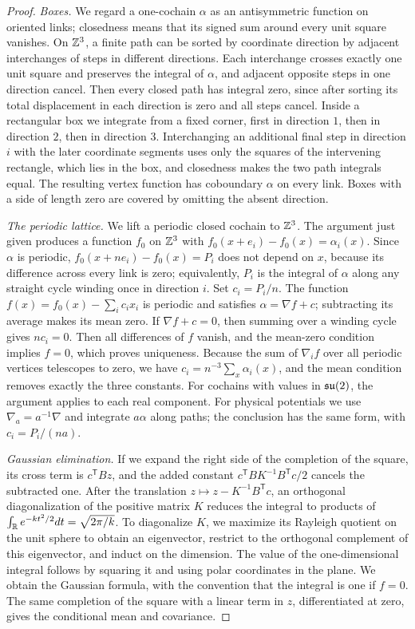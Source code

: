 \begin{proof}
\emph{Boxes.} We regard a one-cochain $\alpha$ as an antisymmetric function on oriented links; closedness means that its signed sum around every unit square vanishes. On $\mathbb Z^3$, a finite path can be sorted by coordinate direction by adjacent interchanges of steps in different directions. Each interchange crosses exactly one unit square and preserves the integral of $\alpha$, and adjacent opposite steps in one direction cancel. Then every closed path has integral zero, since after sorting its total displacement in each direction is zero and all steps cancel. Inside a rectangular box we integrate from a fixed corner, first in direction $1$, then in direction $2$, then in direction $3$. Interchanging an additional final step in direction $i$ with the later coordinate segments uses only the squares of the intervening rectangle, which lies in the box, and closedness makes the two path integrals equal. The resulting vertex function has coboundary $\alpha$ on every link. Boxes with a side of length zero are covered by omitting the absent direction.

\emph{The periodic lattice.} We lift a periodic closed cochain to $\mathbb Z^3$. The argument just given produces a function $f_0$ on $\mathbb Z^3$ with $f_0(x+e_i)-f_0(x)=\alpha_i(x)$. Since $\alpha$ is periodic, $f_0(x+ne_i)-f_0(x)=P_i$ does not depend on $x$, because its difference across every link is zero; equivalently, $P_i$ is the integral of $\alpha$ along any straight cycle winding once in direction $i$. Set $c_i=P_i/n$. The function $f(x)=f_0(x)-\sum_ic_ix_i$ is periodic and satisfies $\alpha=\nabla f+c$; subtracting its average makes its mean zero. If $\nabla f+c=0$, then summing over a winding cycle gives $nc_i=0$. Then all differences of $f$ vanish, and the mean-zero condition implies $f=0$, which proves uniqueness. Because the sum of $\nabla_if$ over all periodic vertices telescopes to zero, we have $c_i=n^{-3}\sum_x\alpha_i(x)$, and the mean condition removes exactly the three constants. For cochains with values in $\mathfrak{su}(2)$, the argument applies to each real component. For physical potentials we use $\nabla_a=a^{-1}\nabla$ and integrate $a\alpha$ along paths; the conclusion has the same form, with $c_i=P_i/(na)$.

\emph{Gaussian elimination.} If we expand the right side of the completion of the square, its cross term is $c^{\mathsf T}Bz$, and the added constant $c^{\mathsf T}BK^{-1}B^{\mathsf T}c/2$ cancels the subtracted one. After the translation $z\mapsto z-K^{-1}B^{\mathsf T}c$, an orthogonal diagonalization of the positive matrix $K$ reduces the integral to products of $\int_\mathbb R e^{-kt^2/2}dt=\sqrt{2\pi/k}$. To diagonalize $K$, we maximize its Rayleigh quotient on the unit sphere to obtain an eigenvector, restrict to the orthogonal complement of this eigenvector, and induct on the dimension. The value of the one-dimensional integral follows by squaring it and using polar coordinates in the plane. We obtain the Gaussian formula, with the convention that the integral is one if $f=0$. The same completion of the square with a linear term in $z$, differentiated at zero, gives the conditional mean and covariance.


\end{proof}
